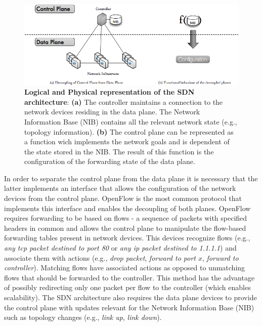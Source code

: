 
\begin{figure}
  \centering 
  \footnotesize
  \includegraphics[scale=0.5]{pic/sdn-2d.png}
  \caption[Logical and Physical representation of the SDN architecture]{\textbf{Logical and Physical representation of the SDN architecture}: \textbf{(a)} The controller maintains a connection to the network devices residing in the data plane. The Network Information Base (NIB) contains all the relevant network state (e.g., topology information). \textbf{(b)} The control plane can be represented as a function wich implements the network goals and is dependent of the state stored in the NIB. The result of this function is the configuration of the forwarding state of the data plane.}
  \label{fig:sdn.2d}
\end{figure}

In order to separate the control plane from the data plane it is necessary that the latter implements an interface that allows the configuration of the network devices from the control plane. OpenFlow \cite{openflow} is the most common protocol  that implements this interface and  enables the decoupling of both planes. OpenFlow requires forwarding to be based on flows - a sequence of packets with specified headers in common and allows the control plane to manipulate the flow-based forwarding tables present in network devices. This devices recognize flows (e.g., \emph{any tcp packet destined to port 80} or \emph{any ip packet destined to 1.1.1.1}) and associate them with actions (e.g., \emph{drop packet}, \emph{forward to port $x$}, \emph{forward to controller}). Matching flows have associated actions as opposed to unmatching flows that should be forwarded to the controller. This method has the advantage of possibly redirecting only one packet per flow to the controller (which enables scalability). The SDN architecture also requires the data plane devices to provide the control plane with  updates relevant for the Network Information Base (NIB) such as topology changes  (e.g., \emph{link up}, \emph{link down}).  

